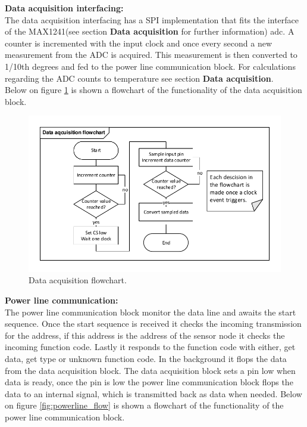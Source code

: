 \textbf{Data acquisition interfacing:}\\
The data acquisition interfacing has a SPI implementation that fits the interface of the MAX1241(see section \textbf{Data acquisition} for further information) adc. A counter is incremented with the input clock and once every second a new measurement from the ADC is acquired. This measurement is then converted to 1/10th degrees and fed to the power line communication block. For calculations regarding the ADC counts to temperature see section \textbf{Data acquisition}.\\
Below on figure \ref{fig:data_acq} is shown a flowchart of the functionality of the data acquisition block.

\begin{figure}[H]
	\centering
	\includegraphics[width=.6\textwidth]{billeder/data_aqc_flowchart}
	\caption{Data acquisition flowchart.}
	\label{fig:data_acq}
\end{figure}

\textbf{Power line communication:}\\
The power line communication block monitor the data line and awaits the start sequence. Once the start sequence is received it checks the incoming transmission for the address, if this address is the address of the sensor node it checks the incoming function code. Lastly it responds to the function code with either, get data, get type or unknown function code. In the background it flops the data from the data acquisition block. The data acquisition block sets a pin low when data is ready, once the pin is low the power line communication block flops the data to an internal signal, which is transmitted back as data when needed. Below on figure \ref{fig:powerline_flow} is shown a flowchart of the functionality of the power line communication block.

